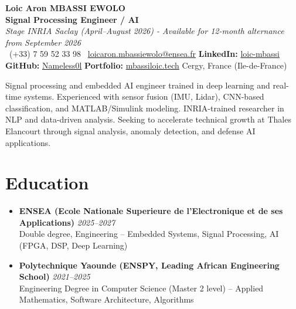 \documentclass[a4paper,11pt]{article}
\begin{document}
\begin{center}
    {\Large \textbf{Loic Aron MBASSI EWOLO}} \\ \vspace{4pt}
    \textbf{\large Signal Processing Engineer / AI} \\
    \textit{\small Stage INRIA Saclay (April--August 2026) - Available for 12-month alternance from September 2026} \\ \vspace{4pt}
    \small
    \Mobilefone\ (+33) 7 59 52 33 98 \quad
    \Letter\ \href{mailto:loicaron.mbassiewolo@ensea.fr}{loicaron.mbassiewolo@ensea.fr} \quad
    \textbf{LinkedIn:} \href{https://www.linkedin.com/in/loic-mbassi/}{loic-mbassi} \\ \vspace{2pt}
    \textbf{GitHub:} \href{https://github.com/Nameless0l}{Nameless0l} \quad
    \textbf{Portfolio:} \href{https://mbassiloic.tech}{mbassiloic.tech} \quad
    Cergy, France (Ile-de-France)
\end{center}

\vspace{-6pt}

\noindent\small{Signal processing and embedded AI engineer trained in deep learning and real-time systems. Experienced with sensor fusion (IMU, Lidar), CNN-based classification, and MATLAB/Simulink modeling. INRIA-trained researcher in NLP and data-driven analysis. Seeking to accelerate technical growth at Thales Elancourt through signal analysis, anomaly detection, and defense AI applications.}

\vspace{6pt}

\section{Education}
\begin{itemize}[leftmargin=*, label=\tiny$\bullet$, nosep]
    \item \textbf{ENSEA (Ecole Nationale Superieure de l'Electronique et de ses Applications)} \hfill \textit{2025--2027} \\
    \small{Double degree, Engineering -- Embedded Systems, Signal Processing, AI (FPGA, DSP, Deep Learning)}
    \item \textbf{Polytechnique Yaounde (ENSPY, Leading African Engineering School)} \hfill \textit{2021--2025} \\
    \small{Engineering Degree in Computer Science (Master 2 level) -- Applied Mathematics, Software Architecture, Algorithms}
\end{itemize}
\end{document}
